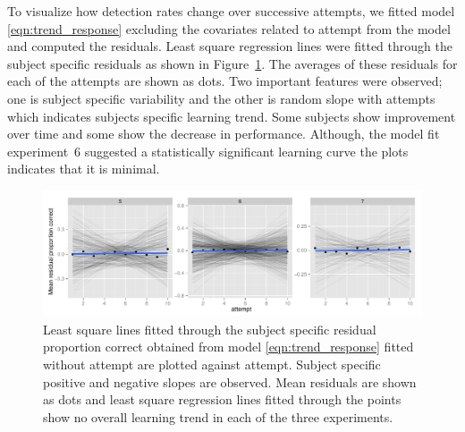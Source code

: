 \documentclass[10pt]{article}\usepackage[]{graphicx}\usepackage[]{color}
\begin{document}
To visualize how  detection rates change over successive attempts, we fitted model \eqref{eqn:trend_response} excluding the covariates related to attempt from the model and computed the residuals. Least square regression lines were fitted through the subject specific residuals as shown in Figure~\ref{fig:learning_trend_response}. The averages of these residuals for each of the attempts are shown as dots. Two important features were observed; one is subject specific variability and the other is random slope with attempts which indicates subjects specific learning trend. Some subjects show improvement over time and some show the decrease in performance. Although, the model fit experiment~6 suggested a statistically significant learning curve the plots indicates that it is minimal. 

\begin{figure}[htbp] 
   \centering
    \includegraphics[width=6.3in]{learning_trend_subject.pdf} 
   \caption{ Least square lines fitted through the subject specific residual proportion correct obtained from model \eqref{eqn:trend_response} fitted without attempt are plotted against attempt. Subject specific positive and negative slopes are observed. Mean residuals are shown as dots and least square regression lines fitted through the points show no overall learning trend in each of the three experiments.}
   \label{fig:learning_trend_response}
\end{figure}

\end{document}
